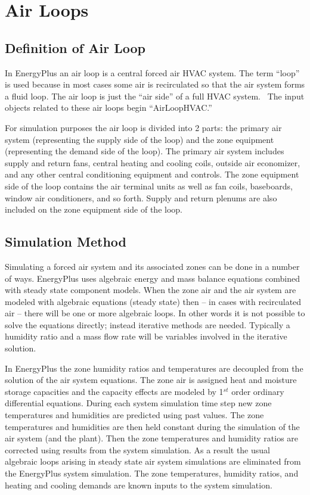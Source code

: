 \section{Air Loops}\label{air-loops}

\subsection{Definition of Air Loop}\label{definition-of-air-loop}

In EnergyPlus an air loop is a central forced air HVAC system. The term ``loop'' is used because in most cases some air is recirculated so that the air system forms a fluid loop. The air loop is just the ``air side'' of a full HVAC system.~ The input objects related to these air loops begin ``AirLoopHVAC.''

For simulation purposes the air loop is divided into 2 parts: the primary air system (representing the supply side of the loop) and the zone equipment (representing the demand side of the loop). The primary air system includes supply and return fans, central heating and cooling coils, outside air economizer, and any other central conditioning equipment and controls. The zone equipment side of the loop contains the air terminal units as well as fan coils, baseboards, window air conditioners, and so forth. Supply and return plenums are also included on the zone equipment side of the loop.

\subsection{Simulation Method}\label{simulation-method}

Simulating a forced air system and its associated zones can be done in a number of ways. EnergyPlus uses algebraic energy and mass balance equations combined with steady state component models. When the zone air and the air system are modeled with algebraic equations (steady state) then -- in cases with recirculated air -- there will be one or more algebraic loops. In other words it is not possible to solve the equations directly; instead iterative methods are needed. Typically a humidity ratio and a mass flow rate will be variables involved in the iterative solution.

In EnergyPlus the zone humidity ratios and temperatures are decoupled from the solution of the air system equations. The zone air is assigned heat and moisture storage capacities and the capacity effects are modeled by 1\(^{st}\) order ordinary differential equations. During each system simulation time step new zone temperatures and humidities are predicted using past values. The zone temperatures and humidities are then held constant during the simulation of the air system (and the plant). Then the zone temperatures and humidity ratios are corrected using results from the system simulation. As a result the usual algebraic loops arising in steady state air system simulations are eliminated from the EnergyPlus system simulation. The zone temperatures, humidity ratios, and heating and cooling demands are known inputs to the system simulation.

